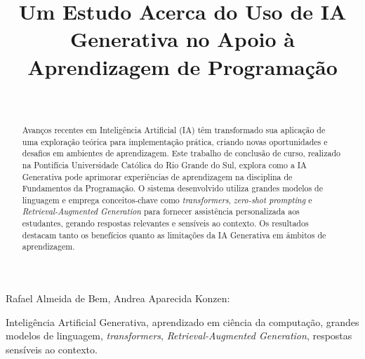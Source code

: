 \documentclass[journal]{IEEEtran}
\begin{document}

\title{Um Estudo Acerca do Uso de IA Generativa no Apoio à Aprendizagem de Programação}

\author{\\
}


%
{Rafael Almeida de Bem, Andrea Aparecida Konzen: \MyTitle}


\maketitle

\begin{abstract}
Avanços recentes em Inteligência Artificial (IA) têm transformado sua aplicação de uma exploração teórica para implementação prática, criando novas oportunidades e desafios em ambientes de aprendizagem.
Este trabalho de conclusão de curso, realizado na Pontifícia Universidade Católica do Rio Grande do Sul, explora como a IA Generativa pode aprimorar experiências de aprendizagem na disciplina de Fundamentos da Programação.
O sistema desenvolvido utiliza grandes modelos de linguagem e emprega conceitos-chave como \textit{transformers}, \textit{zero-shot prompting} e \textit{Retrieval-Augmented Generation} para fornecer assistência personalizada aos estudantes, gerando respostas relevantes e sensíveis ao contexto.
Os resultados destacam tanto os benefícios quanto as limitações da IA Generativa em âmbitos de aprendizagem.
\end{abstract}

\renewcommand{\IEEEkeywordsname}{Palavras-chave}
\begin{IEEEkeywords}
    Inteligência Artificial Generativa, aprendizado em ciência da computação, grandes modelos de linguagem, \textit{transformers}, \textit{Retrieval-Augmented Generation}, respostas sensíveis ao contexto.
\end{IEEEkeywords}
\end{document}
